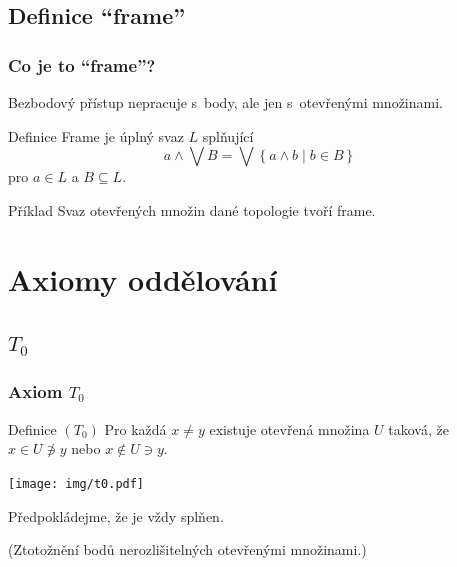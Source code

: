 \documentclass[mathserif]{beamer}
\begin{document}

\subsection{Definice ``frame''}

\begin{frame}
\frametitle{Co je to ``frame''?}
Bezbodový přístup nepracuje s~body, ale jen s~\alert{otevřenými množinami}.
\pause

\begin{block}{Definice}
  {\color{blue}Frame} je úplný svaz $L$ splňující
  \begin{equation*}%
    a \wedge \bigvee B
    = \bigvee \left\{ a \wedge b \mid b \in B \right\}
  \end{equation*}
  pro $a \in L$ a $B \subseteq L$.
\end{block}
\pause

\begin{exampleblock}{Příklad}
  Svaz otevřených množin dané topologie tvoří frame.
\end{exampleblock}
\end{frame}

\section{Axiomy oddělování}

\subsection{$T_0$} %

\begin{frame}
\frametitle{Axiom $T_0$}

\begin{block}{Definice $(T_0)$}
  Pro každá $x \ne y$ existuje otevřená množina $U$ taková, že $x \in U
  \not\owns y$ nebo $x \not\in U \ni y$.
\end{block}

\begin{center}
  \texttt{[image: img/t0.pdf]}
\end{center}
\pause

Předpokládejme, že je \alert{vždy splňen}.

(Ztotožnění bodů nerozlišitelných otevřenými množinami.)

\end{frame}
\end{document}
